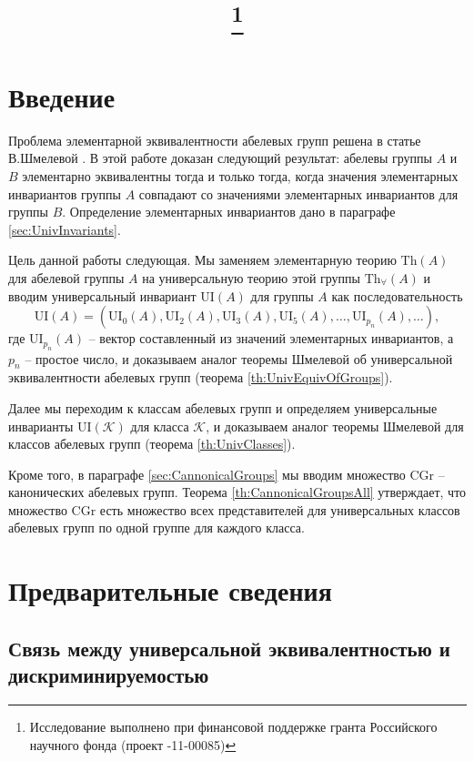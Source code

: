 \documentclass[a4paper,11pt,twoside]{article}
\title{\titles\footnote{Исследование выполнено при финансовой поддержке гранта Российского научного фонда (проект \No 14-11-00085)}}
\author{\authors}
\gdef\firstpage{1}
\def\K{{\mathcal{K}}}
\def\Th{{\mathrm{Th}}}
\def\Tha{{\mathrm{Th}_\forall}}
\def\CG{{\mathrm{CGr}}}
\def\ui{{\mathrm{UI}}}
\begin{document}
\maketitle

\tableofcontents
\listoftodos


\setcounter{page}{\firstpage}
\pagestyle{newpstyle}

\Russian
\sloppy
\rm

\section{Введение}

Проблема элементарной эквивалентности абелевых групп решена в статье В.Шмелевой \cite{Szm}. В этой работе доказан следующий результат: абелевы группы $A$ и $B$ элементарно эквивалентны тогда и только тогда, когда значения элементарных инвариантов группы $A$ совпадают со значениями элементарных инвариантов для группы $B$. Определение элементарных инвариантов дано в параграфе \ref{sec:UnivInvariants}.

Цель данной работы следующая. Мы заменяем элементарную теорию $\Th(A)$ для абелевой группы $A$ на универсальную теорию этой группы $\Tha(A)$ и вводим универсальный инвариант $\ui(A)$ для группы $A$ как последовательность 
$$\ui(A) = (\ui_0(A), \ui_2(A), \ui_3(A), \ui_5(A), \ldots, \ui_{p_n}(A), \ldots ),$$
где $\ui_{p_n}(A)$ -- вектор составленный из значений элементарных инвариантов, а $p_n$ -- простое число, и доказываем аналог теоремы Шмелевой об универсальной эквивалентности абелевых групп (теорема \ref{th:UnivEquivOfGroups}).

Далее мы переходим к классам абелевых групп и определяем универсальные инварианты $\ui(\K)$ для класса $\K$, и доказываем аналог теоремы Шмелевой для классов абелевых групп (теорема \ref{th:UnivClasses}).

Кроме того, в параграфе \ref{sec:CannonicalGroups} мы вводим множество $\CG$ -- канонических абелевых групп. Теорема \ref{th:CannonicalGroupsAll} утверждает, что множество $\CG$ есть множество всех представителей для универсальных классов абелевых групп по одной группе для каждого класса. 

\section{Предварительные сведения}

\subsection{Связь между универсальной эквивалентностью и дискриминируемостью}
\end{document}
